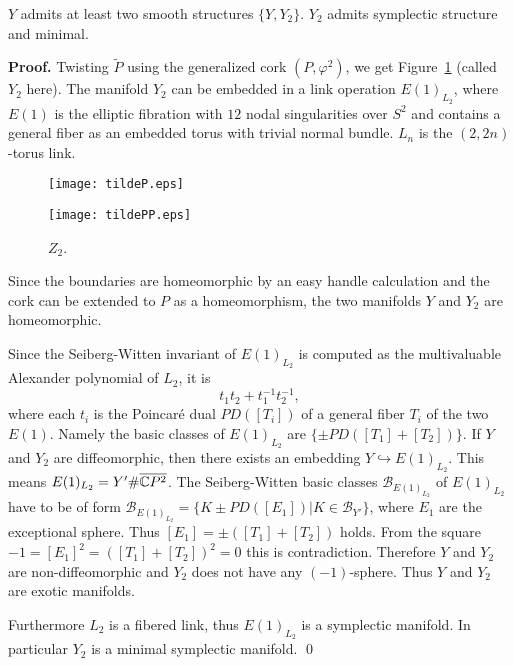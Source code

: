 \documentclass[11pt]{amsart}
\begin{document}
\begin{thm}
\label{goon}
$Y$ admits at least two smooth structures $\{Y,Y_2\}$.
$Y_2$ admits symplectic structure and minimal.
\end{thm}
{{\bf Proof. }}
Twisting $\tilde{P}$ using the generalized cork $(P,\varphi^2)$, we get Figure~\ref{F} (called $Y_2$ here).
The manifold $Y_2$ can be embedded in a link operation $E(1)_{L_2}$, where $E(1)$ is the elliptic fibration with $12$ nodal singularities over $S^2$
and contains a general fiber as an embedded torus with trivial normal bundle.
$L_n$ is the $(2,2n)$-torus link.
\begin{figure}[htbp]
\begin{minipage}{.42\textwidth}
\begin{center}
\texttt{[image: tildeP.eps]}
\caption{$Y_2$.}
\label{FF}
\end{center}
\end{minipage}
\begin{minipage}{.42\textwidth}
\begin{center}
\texttt{[image: tildePP.eps]}
\caption{$Z_2$.}
\label{F}
\end{center}
\end{minipage}
\end{figure}
Since the boundaries are homeomorphic by an easy handle calculation and 
the cork can be extended to $P$ as a homeomorphism, the two manifolds $Y$ and $Y_2$ are homeomorphic.

Since the Seiberg-Witten invariant of $E(1)_{L_2}$ is computed as the multivaluable Alexander polynomial
of $L_2$, it is
$$t_1t_2+t_1^{-1}t_2^{-1},$$
where each $t_i$ is the Poincar\'e dual $PD([T_i])$ of a general fiber $T_i$ of the two $E(1)$.
Namely the basic classes of $E(1)_{L_2}$ are $\{\pm PD([T_1]+[T_2])\}$.
If $Y$ and $Y_2$ are diffeomorphic, then there exists an embedding $Y\hookrightarrow E(1)_{L_2}$.
This means $E(1)_{L_2}=Y'\#\overline{{\Bbb C}P^2}$.
The Seiberg-Witten basic classes $\mathcal{B}_{E(1)_{L_2}}$ of $E(1)_{L_2}$ have to be of form $\mathcal{B}_{E(1)_{L_2}}=\{K\pm PD([E_1])|K\in \mathcal{B}_{Y'}\}$, where $E_1$ are 
the exceptional sphere.
Thus $[E_1]=\pm ([T_1]+[T_2])$ holds.
From the square $-1=[E_1]^2=([T_1]+[T_2])^2=0$ this is contradiction.
Therefore $Y$ and $Y_2$ are non-diffeomorphic and $Y_2$ does not have any $(-1)$-sphere.
Thus $Y$ and $Y_2$ are exotic manifolds.

Furthermore $L_2$ is a fibered link, thus $E(1)_{L_2}$ is a symplectic manifold.
In particular $Y_2$ is a minimal symplectic manifold.
\qed
\medskip
\end{document}
